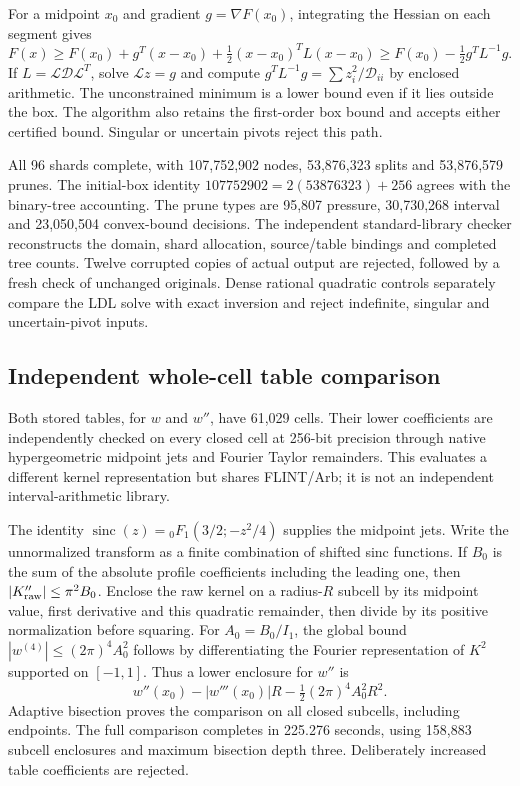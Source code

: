 \documentclass[11pt]{article}
\theoremstyle{remark}\newtheorem{remark}[theorem]{Remark}
\begin{document}
For a midpoint $x_0$ and gradient $g=\nabla F(x_0)$, integrating the
Hessian on each segment gives
\[
 F(x)\ge F(x_0)+g^T(x-x_0)+\tfrac12(x-x_0)^TL(x-x_0)
 \ge F(x_0)-\tfrac12g^TL^{-1}g.
\]
If $L=\mathcal L\mathcal D\mathcal L^T$, solve $\mathcal Lz=g$ and
compute $g^TL^{-1}g=\sum z_i^2/\mathcal D_{ii}$ by enclosed arithmetic.
The unconstrained minimum is a lower bound even if it lies outside the box.
The algorithm also retains the first-order box bound and accepts either
certified bound. Singular or uncertain pivots reject this path.

All 96 shards complete, with 107,752,902 nodes, 53,876,323 splits and
53,876,579 prunes. The initial-box identity
$107752902=2(53876323)+256$ agrees with the binary-tree accounting.
The prune types are 95,807 pressure, 30,730,268 interval and 23,050,504
convex-bound decisions. The independent standard-library checker reconstructs
the domain, shard allocation, source/table bindings and completed tree counts.
Twelve corrupted copies of actual output are rejected, followed by a fresh
check of unchanged originals. Dense rational quadratic controls separately
compare the LDL solve with exact inversion and reject indefinite, singular
and uncertain-pivot inputs.

\subsection{Independent whole-cell table comparison}
Both stored tables, for $w$ and $w''$, have 61,029 cells. Their lower
coefficients are independently checked on every closed cell at 256-bit
precision through native hypergeometric midpoint jets and Fourier Taylor
remainders. This evaluates a different kernel representation but shares
FLINT/Arb; it is not an independent interval-arithmetic library.

The identity $\operatorname{sinc}(z)={}_0F_1(3/2;-z^2/4)$ supplies the
midpoint jets. Write the unnormalized transform as a finite combination of
shifted sinc functions. If $B_0$ is the sum of the absolute profile
coefficients including the leading one, then
$|K_{\rm raw}''|\le\pi^2B_0$. Enclose the raw kernel on a radius-$R$
subcell by its midpoint value, first derivative and this quadratic remainder,
then divide by its positive normalization before squaring. For
$A_0=B_0/I_1$, the global bound
$|w^{(4)}|\le(2\pi)^4A_0^2$ follows by differentiating the Fourier
representation of $K^2$ supported on $[-1,1]$.
Thus a lower enclosure for $w''$ is
\[
 w''(x_0)-|w'''(x_0)|R-\tfrac12(2\pi)^4A_0^2R^2.
\]
Adaptive bisection proves the comparison on all closed subcells, including
endpoints. The full comparison completes in 225.276 seconds, using
158,883 subcell enclosures and maximum bisection depth three. Deliberately
increased table coefficients are rejected.
\end{document}
